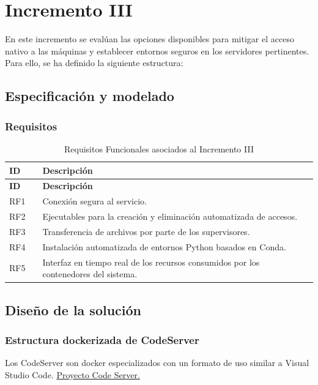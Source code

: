 \chapter{Incremento III}

En este incremento se evalúan las opciones disponibles para mitigar el acceso nativo a las máquinas y establecer entornos seguros en los servidores pertinentes. Para ello, se ha definido la siguiente estructura:

\section{Especificación y modelado}
\subsection{Requisitos}

\begin{longtable}{llp{9cm}} 
\caption{Requisitos Funcionales asociados al Incremento III} \label{tab:servicios_code} \\
\toprule
\textbf{ID} & & \textbf{Descripción} \\
\midrule
\endfirsthead

\toprule
\textbf{ID} & & \textbf{Descripción} \\
\midrule
\endhead

\bottomrule
\endfoot

RF1 & & Conexión segura al servicio. \\
RF2 & & Ejecutables para la creación y eliminación automatizada de accesos. \\
RF3 & & Transferencia de archivos por parte de los supervisores. \\
RF4 & & Instalación automatizada de entornos Python basados en Conda. \\ 
RF5 & & Interfaz en tiempo real de los recursos consumidos por los contenedores del sistema. \\

\end{longtable}




\section{Diseño de la solución}
\subsection{Estructura dockerizada de CodeServer}
Los CodeServer son docker especializados con un formato de uso similar a Visual Studio Code. \href{https://github.com/coder/code-server?tab=readme-ov-file}{Proyecto Code Server.}

